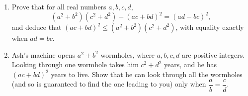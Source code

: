 \begin{enumerate}
\item[(a)] Prove that for all real numbers $a,b,c,d$,
\[\left(a^2+b^2\right)\left(c^2+d^2\right)-(ac+bd)^2=(ad-bc)^2,\]
and deduce that $(ac+bd)^2\le\left(a^2+b^2\right)\left(c^2+d^2\right)$, with equality exactly when $ad=bc$.
\item[(b)] Ash's machine opens $a^2+b^2$ wormholes, where $a,b,c,d$ are positive integers. Looking through one wormhole takes him $c^2+d^2$ years, and he has $(ac+bd)^2$ years to live. Show that he can look through all the wormholes (and so is guaranteed to find the one leading to you) only when $\dfrac ab=\dfrac cd$.
\end{enumerate}
